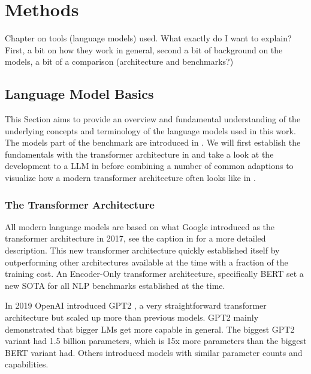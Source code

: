 \chapter{Methods}\label{chap:methods}
{\color{blue}
Chapter on tools (language models) used. What exactly do I want to explain?
First, a bit on how they work in general, second a bit of background on the models, a bit of a comparison (architecture and benchmarks?)
}


\section{Language Model Basics}\label{sec:basics}
This Section aims to provide an overview and fundamental understanding of the underlying concepts and terminology of the language models used in this work.
The models part of the benchmark are introduced in .
We will first establish the fundamentals with the transformer architecture in  and take a look at the development to a \acrlong{LLM} in  before combining a number of common adaptions to visualize how a modern transformer architecture often looks like in .


\subsection{The Transformer Architecture}\label{sub:transformer}


All modern language models are based on what Google introduced as the transformer architecture \cite{vaswani_attention_2017} in 2017, see the caption in  for a more detailed description. 
This new transformer architecture quickly established itself by outperforming other architectures available at the time with a fraction of the training cost.
An Encoder-Only transformer architecture, specifically \gls{BERT} set a new \gls{SOTA} for all \gls{NLP} benchmarks established at the time.

In 2019 \gls{OpenAI} introduced \gls{GPT2} \cite{radford_language_2019}, a very straightforward transformer architecture but scaled up more than previous models. \gls{GPT2} mainly demonstrated that bigger \glspl{LM} get more capable in general.
The biggest \gls{GPT2} variant had 1.5 billion parameters, which is 15x more parameters than the biggest \gls{BERT} variant had.
Others introduced models with similar parameter counts and capabilities.

